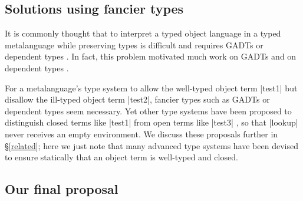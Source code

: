 \subsection{Solutions using fancier types}

It is commonly thought that to interpret a typed object language in
a typed metalanguage while preserving types is difficult and requires
GADTs or dependent types \citep{taha-tag}.  In fact, this problem
motivated much work on GADTs \cite{xi-guarded,peyton-jones-simple} and
on dependent types \cite{WalidICFP02,fogarty-concoqtion}.

For a metalanguage's type system to allow the well-typed object term
|test1| but disallow the ill-typed object term |test2|, fancier types
such as GADTs or dependent types seem necessary.  Yet other type systems
have been proposed to distinguish closed terms like |test1| from open
terms like |test3|
\cite{WalidPOPL03,NanevskiJFP05,DaviesJACM01},
so that |lookup| never receives an empty environment.  We discuss these
proposals further in \S\ref{related}; here we just note that many
advanced type systems have been devised to ensure statically that an
object term is well-typed and closed.

\subsection{Our final proposal}\label{ourapproach}

